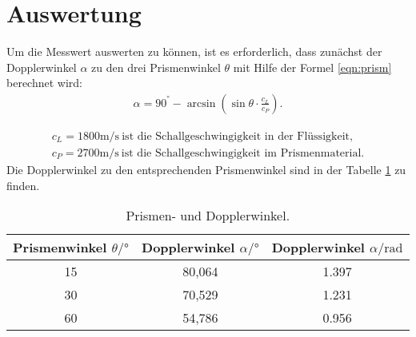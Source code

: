 \section{Auswertung}
\label{sec:Auswertung}
Um die Messwert auswerten zu können, ist es erforderlich,
dass zunächst der Dopplerwinkel $\alpha$ zu den drei Prismenwinkel $\theta$
mit Hilfe der Formel \eqref{eqn:prism} berechnet wird:
\begin{align}
  \alpha=90^°-\arcsin(\sin\theta\cdot\frac{c_L}{c_P})\label{eqn:prism}.
\end{align}

\begin{align*}
c_L= 1800\si{\meter\per\second}  \ \text{ist die Schallgeschwingigkeit in der Flüssigkeit},\\
c_P= 2700\si{\meter\per\second} \ \text{ist die Schallgeschwingigkeit im Prismenmaterial.}
\end{align*}
Die Dopplerwinkel zu den entsprechenden Prismenwinkel
sind in der Tabelle \ref{tab:winkel} zu finden.
\begin{table}
  \centering
  \caption{Prismen- und Dopplerwinkel.}
  \label{tab:winkel}
  \begin{tabular}{c c c}
    \toprule
    Prismenwinkel $\theta/\si{\degree}$& Dopplerwinkel $\alpha / \si{\degree}$& Dopplerwinkel $\alpha /\si{\radian}$\\
    \midrule
15 & 80,064 & 1.397\\
30 & 70,529 & 1.231\\
60 & 54,786 & 0.956\\
    \bottomrule
  \end{tabular}
\end{table}
